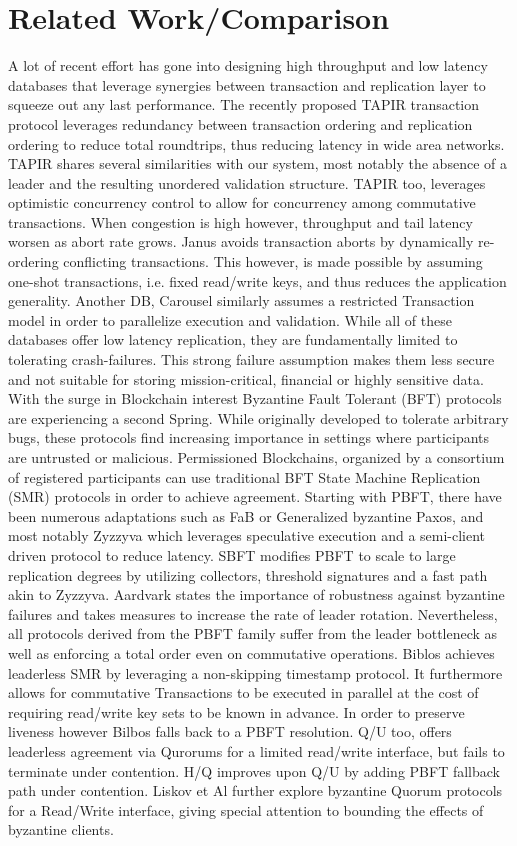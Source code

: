 \section{Related Work/Comparison}
A lot of recent effort has gone into designing high throughput and low latency databases that leverage synergies between transaction and replication layer to squeeze out any last performance. The recently proposed TAPIR transaction protocol leverages redundancy between transaction ordering and replication ordering to reduce total roundtrips, thus reducing latency in wide area networks. TAPIR shares several similarities with our system, most notably the absence of a leader and the resulting unordered validation structure. TAPIR too, leverages optimistic concurrency control to allow for concurrency among commutative transactions. When congestion is high however, throughput and tail latency worsen as abort rate grows. Janus avoids transaction aborts by dynamically re-ordering conflicting transactions. This however, is made possible by assuming one-shot transactions, i.e. fixed read/write keys, and thus reduces the application generality. Another DB, Carousel similarly assumes a restricted Transaction model in order to parallelize execution and validation. While all of these databases offer low latency replication, they are fundamentally limited to tolerating crash-failures. This strong failure assumption makes them less secure and not suitable for storing mission-critical, financial or highly sensitive data. 
With the surge in Blockchain interest Byzantine Fault Tolerant (BFT) protocols are experiencing a second Spring. While originally developed to tolerate arbitrary bugs, these protocols find increasing importance in settings where participants are untrusted or malicious. Permissioned Blockchains, organized by a consortium of registered participants can use traditional BFT State Machine Replication (SMR) protocols in order to achieve agreement. Starting with PBFT, there have been numerous adaptations such as FaB or Generalized byzantine Paxos, and most notably Zyzzyva which leverages speculative execution and a semi-client driven protocol to reduce latency. SBFT modifies PBFT to scale to large replication degrees by utilizing collectors, threshold signatures and a fast path akin to Zyzzyva. Aardvark states the importance of robustness against byzantine failures and takes measures to increase the rate of leader rotation.
Nevertheless, all protocols derived from the PBFT family suffer from the leader bottleneck as well as enforcing a total order even on commutative operations. Biblos achieves leaderless SMR by leveraging a non-skipping timestamp protocol. It furthermore allows for commutative Transactions to be executed in parallel at the cost of requiring read/write key sets to be known in advance. In order to preserve liveness however Bilbos falls back to a PBFT resolution. Q/U too, offers leaderless agreement via Qurorums for a limited read/write interface, but fails to terminate under contention. H/Q improves upon Q/U by adding PBFT fallback path under contention. Liskov et Al further explore byzantine Quorum protocols for a Read/Write interface, giving special attention to bounding the effects of byzantine clients. 
